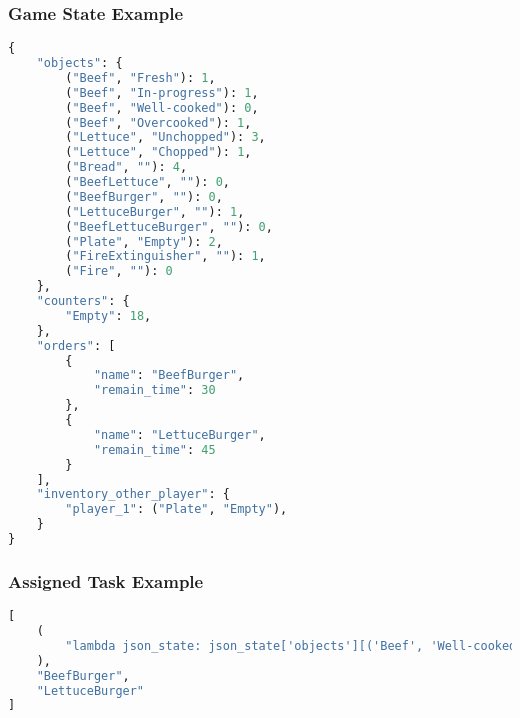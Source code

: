 
\subsubsection{Game State Example}
\begin{lstlisting}[language=Python]
{
    "objects": {
        ("Beef", "Fresh"): 1,
        ("Beef", "In-progress"): 1,
        ("Beef", "Well-cooked"): 0,
        ("Beef", "Overcooked"): 1,
        ("Lettuce", "Unchopped"): 3,
        ("Lettuce", "Chopped"): 1,
        ("Bread", ""): 4,
        ("BeefLettuce", ""): 0,
        ("BeefBurger", ""): 0,
        ("LettuceBurger", ""): 1,
        ("BeefLettuceBurger", ""): 0,
        ("Plate", "Empty"): 2,
        ("FireExtinguisher", ""): 1,
        ("Fire", ""): 0
    },
    "counters": {
        "Empty": 18,
    },
    "orders": [
        {
            "name": "BeefBurger",
            "remain_time": 30
        },
        {
            "name": "LettuceBurger",
            "remain_time": 45
        }
    ],
    "inventory_other_player": {
        "player_1": ("Plate", "Empty"),
    }
}
\end{lstlisting}

\subsubsection{Assigned Task Example}
\begin{lstlisting}[language=Python]
[
    (
        "lambda json_state: json_state['objects'][('Beef', 'Well-cooked')] + json_state['objects'][('Beef', 'In-progress')] < sum(order['name'] == 'BeefBurger' or order['name'] == 'BeefLettuceBurger' for order in json_state['orders'])", ("prepare", {"food": "Beef", "plate": False})
    ),
    "BeefBurger",
    "LettuceBurger"
]
\end{lstlisting}

